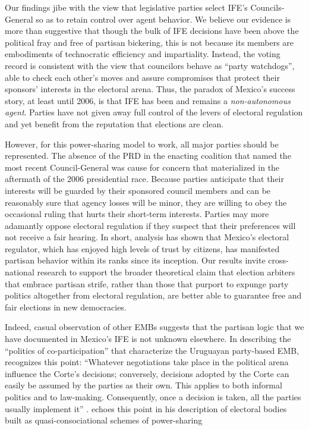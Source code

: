 \documentclass[12 pt, letter]{article}
\begin{document}
Our findings jibe with the view that legislative parties select IFE's Councils-General so as to retain control over agent behavior.  We believe our evidence is more than suggestive that though the bulk of IFE decisions have been above the political fray and free of partisan bickering, this is not because its members are embodiments of technocratic efficiency and impartiality.  Instead, the voting record is consistent with the view that councilors behave as ``party watchdogs'', able to check each other's moves and assure compromises that protect their sponsors' interests in the electoral arena.  Thus, the paradox of Mexico's success story, at least until 2006, is that IFE has been and remains a \emph{non-autonomous agent}.  Parties have not given away full control of the levers of electoral regulation and yet benefit from the reputation that elections are clean.

However, for this power-sharing model to work, all major parties should be represented. The absence of the PRD in the enacting coalition that named the most recent Council-General was cause for concern that materialized in the aftermath of the 2006 presidential race. Because parties anticipate that their interests will be guarded by their sponsored council members and can be reasonably sure that agency losses will be minor, they are willing to obey the occasional ruling that hurts their short-term interests. Parties may more adamantly oppose electoral regulation if they suspect that their preferences will not receive a fair hearing. In short, analysis has shown that Mexico's electoral regulator, which has enjoyed high levels of trust by citizens, has manifested partisan behavior within its ranks since its inception.   Our results invite cross-national research to support the broader theoretical claim that election arbiters that embrace partisan strife, rather than those that purport to expunge party politics altogether from electoral regulation, are better able to guarantee free and fair elections in new democracies.

Indeed, casual observation of other EMBs suggests that the partisan logic that we have documented in Mexico's IFE is not unknown elsewhere.  In describing the ``politics of co-participation'' that characterize the Uruguayan party-based EMB, \citeauthor{LopezPintor2000} recognizes this point: ``Whatever negotiations take place in the political arena influence the Corte's decisions; conversely, decisions adopted by the Corte can easily be assumed by the parties as their own. This applies to both informal politics and to law-making. Consequently, once a decision is taken, all the parties usually implement it'' \citep[p. 23]{LopezPintor2000}.  \citeauthor{Mozaffar2002a} echoes this point in his description of electoral bodies built as quasi-consociational schemes of power-sharing \citep[p. 16]{Mozaffar2002a}
\end{document}
